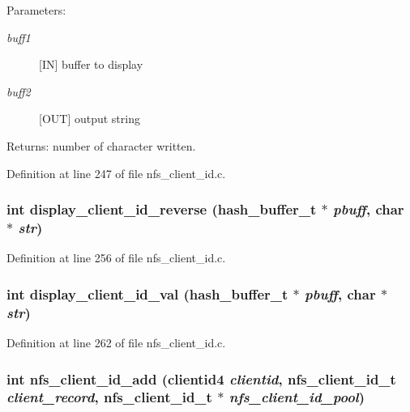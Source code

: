 \begin{Desc}
\item[Parameters:]
\begin{description}
\item[{\em buff1}][IN] buffer to display \item[{\em buff2}][OUT] output string\end{description}
\end{Desc}
\begin{Desc}
\item[Returns:]number of character written. \end{Desc}


Definition at line 247 of file nfs\_\-client\_\-id.c.
\subsubsection{\setlength{\rightskip}{0pt plus 5cm}int display\_\-client\_\-id\_\-reverse (hash\_\-buffer\_\-t $\ast$ {\em pbuff}, char $\ast$ {\em str})}\label{nfs__client__id_8c_a11}




Definition at line 256 of file nfs\_\-client\_\-id.c.
\subsubsection{\setlength{\rightskip}{0pt plus 5cm}int display\_\-client\_\-id\_\-val (hash\_\-buffer\_\-t $\ast$ {\em pbuff}, char $\ast$ {\em str})}\label{nfs__client__id_8c_a12}




Definition at line 262 of file nfs\_\-client\_\-id.c.
\subsubsection{\setlength{\rightskip}{0pt plus 5cm}int nfs\_\-client\_\-id\_\-add (clientid4 {\em clientid}, nfs\_\-client\_\-id\_\-t {\em client\_\-record}, nfs\_\-client\_\-id\_\-t $\ast$ {\em nfs\_\-client\_\-id\_\-pool})}\label{nfs__client__id_8c_a13}


